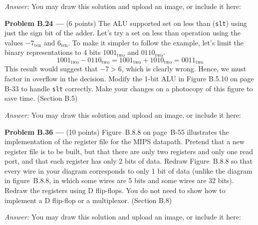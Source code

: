 \documentclass[11pt]{article}
\newcommand{\problem}[1]{\textbf{Problem #1 ---} }
\newcommand{\answer}{{\color{red}\textit{Answer: }}}
\begin{document}
\answer
You may draw this solution and upload an image, or include it here:

\problem{B.24}(6 points) The ALU supported set on less than (\texttt{slt}) using just the sign bit of the adder.  Let's try a set on less than operation using the values $-7_\text{ten}$ and $6_\text{ten}$.  To make it simpler to follow the example, let's limit the binary representations to 4 bits $1001_\text{two}$ and $0110_\text{two}$.
\[ 1001_\text{two} - 0110_\text{two} = 1001_\text{two} + 1010_\text{two} = 0011_\text{two} \]
This result would suggest that $-7 > 6$, which is clearly wrong.  Hence, we must factor in overflow in the decision.  Modify the 1-bit ALU in Figure B.5.10 on page B-33 to handle \texttt{slt} correctly.  Make your changes on a photocopy of this figure to save time. (Section B.5)

\answer
You may draw this solution and upload an image, or include it here:

\problem{B.36}(10 points) Figure~B.8.8 on page~B-55 illustrates the implementation of the register file for the MIPS datapath.  Pretend that a new register file is to be built, but that there are only two registers and only one read port, and that each register has only 2 bits of data.  Redraw Figure~B.8.8 so that every wire in your diagram corresponds to only 1 bit of data (unlike the diagram in figure~B.8.8, in which some wires are 5 bits and some wires are 32 bits).  Redraw the registers using D flip-flops.  You do not need to show how to implement a D flip-flop or a multiplexor. (Section B.8)

\answer
You may draw this solution and upload an image, or include it here:
\end{document}
